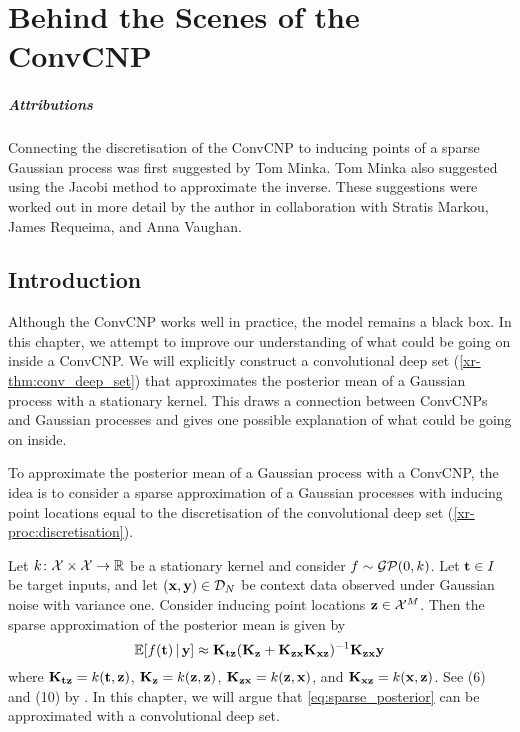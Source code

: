 \documentclass[12pt]{report}
\newcommand{\xrprefix}[1]{xr-#1}
\begin{document}
\chapter
    [Behind the Scenes of the ConvCNP]
    {Behind the Scenes \tnl of the ConvCNP}
\label{app:inside_convcnp}

\paragraph{Attributions}
Connecting the discretisation of the ConvCNP to inducing points of a sparse Gaussian process was first suggested by Tom Minka.
Tom Minka also suggested using the Jacobi method to approximate the inverse.
These suggestions were worked out in more detail by the author in collaboration with Stratis Markou, James Requeima, and Anna Vaughan.

\section{Introduction}
Although the ConvCNP works well in practice, the model remains a black box.
In this chapter, we attempt to improve our understanding of what could be going on inside a ConvCNP.
We will explicitly construct a convolutional deep set (\cref{\xrprefix{thm:conv_deep_set}}) that approximates the posterior mean of a Gaussian process with a stationary kernel.
This draws a connection between ConvCNPs and Gaussian processes and gives one possible explanation of what could be going on inside. %

To approximate the posterior mean of a Gaussian process with a ConvCNP,
the idea is to consider a sparse approximation of a Gaussian processes \parencite{Titsias:2009:Variational_Learning} with inducing point locations equal to the discretisation of the convolutional deep set (\cref{\xrprefix{proc:discretisation}}).

Let $k\colon \X \times \X \to \R$ be a stationary kernel and consider $f \sim \GP(0, k)$.
Let $\vt \in I$ be target inputs, and let $(\vx, \vy) \in \D_N$ be context data observed under Gaussian noise with variance one.
Consider inducing point locations $\vz \in \X^M$.
Then the sparse approximation of the posterior mean is given by
\begin{equation} \label{eq:sparse_posterior}
    \E[f(\vt) \cond \vy] \approx \mK_{\vt\vz} (\mK_{\vz} + \mK_{\vz\vx} \mK_{\vx\vz})^{-1} \mK_{\vz\vx} \vy
\end{equation}
where $\mK_{\vt\vz} = k(\vt,\vz)$, $\mK_\vz = k(\vz, \vz)$, $\mK_{\vz\vx} = k(\vz, \vx)$, and $\mK_{\vx\vz} = k(\vx, \vz)$.
See (6) and (10) by \textcite{Titsias:2009:Variational_Learning}.
In this chapter, we will argue that \eqref{eq:sparse_posterior} can be approximated with a convolutional deep set.
\end{document}
